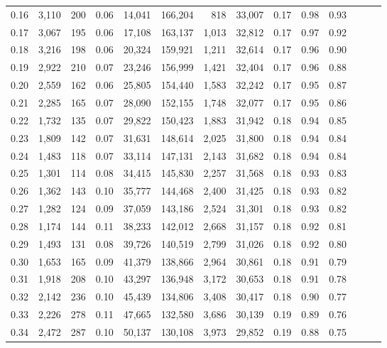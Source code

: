 \begin{tabular}{rrrrrrrrrrrrrr}
0.16 &  3,110 &  200 &  0.06 &   14,041 &  166,204 &     818 &  33,007 &  0.17 &  0.98 &      0.93 \\
0.17 &  3,067 &  195 &  0.06 &   17,108 &  163,137 &   1,013 &  32,812 &  0.17 &  0.97 &      0.92 \\
0.18 &  3,216 &  198 &  0.06 &   20,324 &  159,921 &   1,211 &  32,614 &  0.17 &  0.96 &      0.90 \\
0.19 &  2,922 &  210 &  0.07 &   23,246 &  156,999 &   1,421 &  32,404 &  0.17 &  0.96 &      0.88 \\
0.20 &  2,559 &  162 &  0.06 &   25,805 &  154,440 &   1,583 &  32,242 &  0.17 &  0.95 &      0.87 \\
0.21 &  2,285 &  165 &  0.07 &   28,090 &  152,155 &   1,748 &  32,077 &  0.17 &  0.95 &      0.86 \\
0.22 &  1,732 &  135 &  0.07 &   29,822 &  150,423 &   1,883 &  31,942 &  0.18 &  0.94 &      0.85 \\
0.23 &  1,809 &  142 &  0.07 &   31,631 &  148,614 &   2,025 &  31,800 &  0.18 &  0.94 &      0.84 \\
0.24 &  1,483 &  118 &  0.07 &   33,114 &  147,131 &   2,143 &  31,682 &  0.18 &  0.94 &      0.84 \\
0.25 &  1,301 &  114 &  0.08 &   34,415 &  145,830 &   2,257 &  31,568 &  0.18 &  0.93 &      0.83 \\
0.26 &  1,362 &  143 &  0.10 &   35,777 &  144,468 &   2,400 &  31,425 &  0.18 &  0.93 &      0.82 \\
0.27 &  1,282 &  124 &  0.09 &   37,059 &  143,186 &   2,524 &  31,301 &  0.18 &  0.93 &      0.82 \\
0.28 &  1,174 &  144 &  0.11 &   38,233 &  142,012 &   2,668 &  31,157 &  0.18 &  0.92 &      0.81 \\
0.29 &  1,493 &  131 &  0.08 &   39,726 &  140,519 &   2,799 &  31,026 &  0.18 &  0.92 &      0.80 \\
0.30 &  1,653 &  165 &  0.09 &   41,379 &  138,866 &   2,964 &  30,861 &  0.18 &  0.91 &      0.79 \\
0.31 &  1,918 &  208 &  0.10 &   43,297 &  136,948 &   3,172 &  30,653 &  0.18 &  0.91 &      0.78 \\
0.32 &  2,142 &  236 &  0.10 &   45,439 &  134,806 &   3,408 &  30,417 &  0.18 &  0.90 &      0.77 \\
0.33 &  2,226 &  278 &  0.11 &   47,665 &  132,580 &   3,686 &  30,139 &  0.19 &  0.89 &      0.76 \\
0.34 &  2,472 &  287 &  0.10 &   50,137 &  130,108 &   3,973 &  29,852 &  0.19 &  0.88 &      0.75 \\

\end{tabular}
